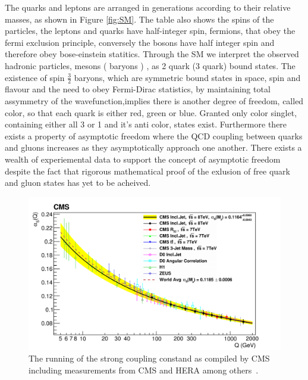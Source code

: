 The quarks and leptons are arranged in generations according to their relative masses, as shown in Figure \ref{fig:SM}. The table also shows the spins of the particles, the leptons and quarks have half-integer spin, fermions, that obey the fermi exclusion principle, conversely the bosons have half integer spin and therefore obey bose-einstein statitics. Through the SM we interpret the observed hadronic particles, mesons ( baryons ) , as 2 quark (3 quark) bound states. The existence of spin $\frac{3}{2}$ baryons, which are symmetric bound states in space, spin and flavour and the need to obey Fermi-Dirac statistics, by maintaining total assymmetry of the wavefunction,implies there is another degree of freedom, called color, so that each quark is either red, green or blue. Granted only color singlet, containing either all 3 or 1 and it's anti color, states exist. Furthermore there exists a property of asymptotic freedom where the QCD coupling between quarks and gluons increases as they asymptotically approach one another. There exists a wealth of experiemental data to support the concept of asymptotic freedom despite the fact that rigorous mathematical proof of the exlusion of free quark and gluon states has yet to be acheived.




\begin{figure}[htb]
\centering
\includegraphics[width=1.0\textwidth]{visuals/strong-coupling-cms2.png}
\caption{The running of the strong coupling constand as compiled by CMS including measurements from CMS and HERA among others~\cite{CMS:2014mna}.}
\label{fig:alphas}
\end{figure}





